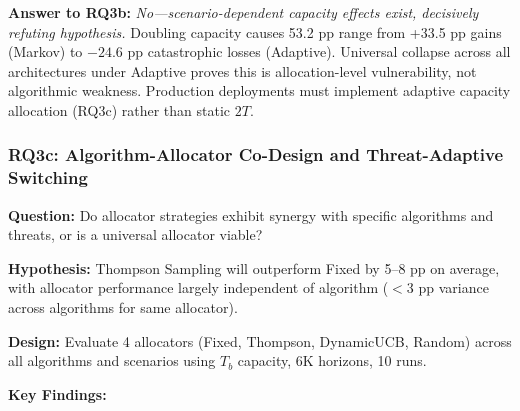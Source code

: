\noindent\textbf{Answer to RQ3b:} \textit{No—scenario-dependent capacity effects exist, decisively refuting hypothesis.} Doubling capacity causes 53.2 pp range from +33.5 pp gains (Markov) to $-24.6$ pp catastrophic losses (Adaptive). Universal collapse across all architectures under Adaptive proves this is allocation-level vulnerability, not algorithmic weakness. Production deployments must implement adaptive capacity allocation (RQ3c) rather than static $2T$.


\subsubsection{RQ3c: Algorithm-Allocator Co-Design and Threat-Adaptive Switching}

\noindent\textbf{Question:} Do allocator strategies exhibit synergy with specific algorithms and threats, or is a universal allocator viable?

\noindent\textbf{Hypothesis:} Thompson Sampling will outperform Fixed by 5--8 pp on average, with allocator performance largely independent of algorithm ($<$3 pp variance across algorithms for same allocator).

\noindent\textbf{Design:} Evaluate 4 allocators (Fixed, Thompson, DynamicUCB, Random) across all algorithms and scenarios using $T_b$ capacity, 6K horizons, 10 runs.

\noindent\textbf{Key Findings:}

